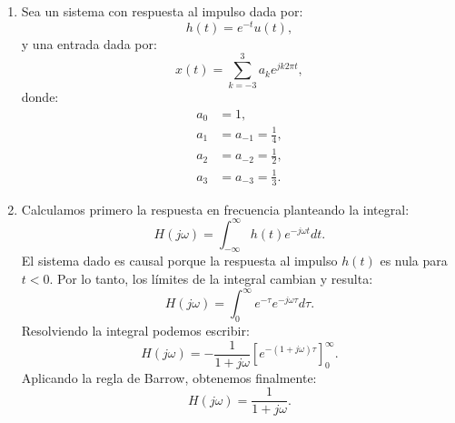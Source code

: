 \documentclass[11pt,a4paper,openany]{book}
\begin{document}
\begin{enumerate}
	\item Sea un sistema con respuesta al impulso dada por:
	\begin{equation}
		h(t) = e^{-t} u(t),
	\end{equation}
	y una entrada dada por:
	\begin{equation}
		x(t) = \sum_{k=-3}^{3} a_{k} e^{jk2\pi t},
	\end{equation}
	donde:
	\begin{equation}
		\begin{aligned}
			a_{0} &= 1, \\
			a_{1} &= a_{-1} = \frac{1}{4}, \\
			a_{2} &= a_{-2} = \frac{1}{2}, \\
			a_{3} &= a_{-3} = \frac{1}{3}.
		\end{aligned}
	\end{equation}
	
	\item Calculamos primero la respuesta en frecuencia planteando la integral:
	\begin{equation}
		H(j\omega) = \int_{-\infty}^{\infty} h(t) e^{-j\omega t} dt.
	\end{equation}
	El sistema dado es causal porque la respuesta al impulso $h(t)$ es nula para $t < 0$. Por lo tanto, los l\'{i}mites de la integral cambian y resulta:
	\begin{equation}
		H(j\omega) = \int_{0}^{\infty} e^{-\tau} e^{-j\omega \tau} d\tau.
	\end{equation}
	Resolviendo la integral podemos escribir:
	\begin{equation}
		H(j\omega) = -\frac{1}{1+j\omega} \left[ e^{-(1+j\omega)\tau} \right]_{0}^{\infty}.
	\end{equation}
	Aplicando la regla de Barrow, obtenemos finalmente:
	\begin{equation}
		H(j\omega) = \frac{1}{1+j\omega}.
	\end{equation}
	

\end{enumerate}
\end{document}
